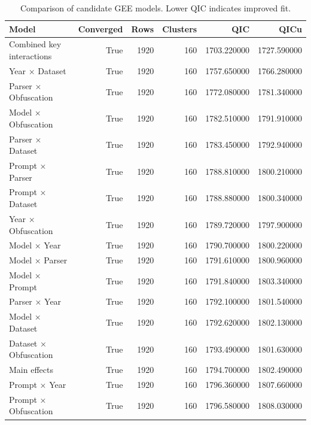 \begin{table}[t]
\caption{Comparison of candidate GEE models. Lower QIC indicates improved fit.}
\label{tab:qic_models}
\begin{tabular}{lrrrrr}
\toprule
Model & Converged & Rows & Clusters & QIC & QICu \\
\midrule
Combined key interactions & True & 1920 & 160 & 1703.220000 & 1727.590000 \\
Year × Dataset & True & 1920 & 160 & 1757.650000 & 1766.280000 \\
Parser × Obfuscation & True & 1920 & 160 & 1772.080000 & 1781.340000 \\
Model × Obfuscation & True & 1920 & 160 & 1782.510000 & 1791.910000 \\
Parser × Dataset & True & 1920 & 160 & 1783.450000 & 1792.940000 \\
Prompt × Parser & True & 1920 & 160 & 1788.810000 & 1800.210000 \\
Prompt × Dataset & True & 1920 & 160 & 1788.880000 & 1800.340000 \\
Year × Obfuscation & True & 1920 & 160 & 1789.720000 & 1797.900000 \\
Model × Year & True & 1920 & 160 & 1790.700000 & 1800.220000 \\
Model × Parser & True & 1920 & 160 & 1791.610000 & 1800.960000 \\
Model × Prompt & True & 1920 & 160 & 1791.840000 & 1803.340000 \\
Parser × Year & True & 1920 & 160 & 1792.100000 & 1801.540000 \\
Model × Dataset & True & 1920 & 160 & 1792.620000 & 1802.130000 \\
Dataset × Obfuscation & True & 1920 & 160 & 1793.490000 & 1801.630000 \\
Main effects & True & 1920 & 160 & 1794.700000 & 1802.490000 \\
Prompt × Year & True & 1920 & 160 & 1796.360000 & 1807.660000 \\
Prompt × Obfuscation & True & 1920 & 160 & 1796.580000 & 1808.030000 \\
\bottomrule
\end{tabular}
\end{table}
